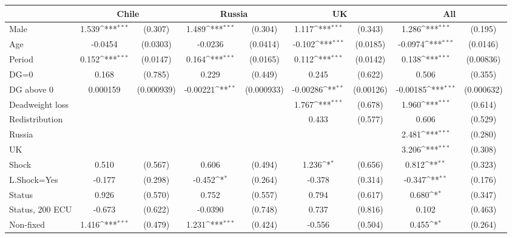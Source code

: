 {
\def\sym#1{\ifmmode^{#1}\else\(^{#1}\)\fi}
\begin{tabular}{l*{4}{cc}}
\hline\hline
                &\multicolumn{2}{c}{Chile}   &\multicolumn{2}{c}{Russia}  &\multicolumn{2}{c}{UK}      &\multicolumn{2}{c}{All}     \\
\hline
Male            &    1.539\sym{***}&  (0.307)&    1.489\sym{***}&  (0.304)&    1.117\sym{***}&  (0.343)&    1.286\sym{***}&  (0.195)\\
Age             &  -0.0454         & (0.0303)&  -0.0236         & (0.0414)&   -0.102\sym{***}& (0.0185)&  -0.0974\sym{***}& (0.0146)\\
Period          &    0.152\sym{***}& (0.0147)&    0.164\sym{***}& (0.0165)&    0.112\sym{***}& (0.0142)&    0.138\sym{***}&(0.00836)\\
DG=0            &    0.168         &  (0.785)&    0.229         &  (0.449)&    0.245         &  (0.622)&    0.506         &  (0.355)\\
DG above 0      & 0.000159         &(0.000939)& -0.00221\sym{**} &(0.000933)& -0.00286\sym{**} &(0.00126)& -0.00185\sym{***}&(0.000632)\\
Deadweight loss &                  &         &                  &         &    1.767\sym{***}&  (0.678)&    1.960\sym{***}&  (0.614)\\
Redistribution  &                  &         &                  &         &    0.433         &  (0.577)&    0.606         &  (0.529)\\
Russia          &                  &         &                  &         &                  &         &    2.481\sym{***}&  (0.280)\\
UK              &                  &         &                  &         &                  &         &    3.206\sym{***}&  (0.308)\\
Shock           &    0.510         &  (0.567)&    0.606         &  (0.494)&    1.236\sym{*}  &  (0.656)&    0.812\sym{**} &  (0.323)\\
L.Shock=Yes     &   -0.177         &  (0.298)&   -0.452\sym{*}  &  (0.264)&   -0.378         &  (0.314)&   -0.347\sym{**} &  (0.176)\\
Status          &    0.926         &  (0.570)&    0.752         &  (0.557)&    0.794         &  (0.617)&    0.680\sym{*}  &  (0.347)\\
Status, 200 ECU &   -0.673         &  (0.622)&  -0.0390         &  (0.748)&    0.737         &  (0.816)&    0.102         &  (0.463)\\
Non-fixed       &    1.416\sym{***}&  (0.479)&    1.231\sym{***}&  (0.424)&   -0.556         &  (0.504)&    0.455\sym{*}  &  (0.264)\\

\end{tabular}}
